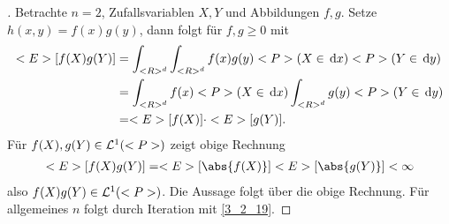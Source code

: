 \begin{proof}[]
	Betrachte $n=2$, Zufallsvariablen $X,Y$ und Abbildungen $f,g$. Setze $h(x,y) = f(x)g(y)$, dann folgt für $f,g \ge 0$ mit 
	\begin{align*}
		<E>[f(X)g(Y)] &= \int_{<R>^d} \int_{<R>^d} f(x)g(y)<P>(X\in \,\mathrm{d} x)<P>(Y\in \,\mathrm{d} y)\\
		&= \int_{<R>^d} f(x)<P>(X \in \,\mathrm{d} x)\int_{<R>^d} g(y)<P>(Y \in \,\mathrm{d} y)\\
		&= <E>[f(X)]\cdot <E>[g(Y)].
	\end{align*}
	Für $f(X),g(Y) \in \mathcal{L}^{1}(<P>)$ zeigt obige Rechnung
	\begin{align*}
		\E[f(X)g(Y)] = \E[\abs{f(X)}]\E[\abs{g(Y)}] < \infty
	\end{align*}
	also $f(X)g(Y) \in \mathcal{L}^{1}(<P>)$. Die Aussage folgt über die obige Rechnung. Für allgemeines $n$ folgt  durch Iteration mit \cref{3_2_19}.
\end{proof}
